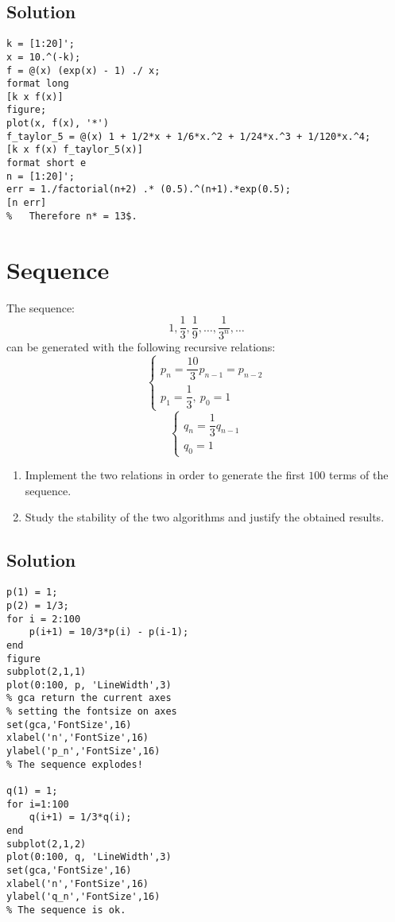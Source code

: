 \documentclass[12pt, a4paper]{report}
\begin{document}
    \subsection*{Solution}
        \begin{lstlisting}[style=Matlab]
%   Evaluate f(x) for values of x around zero (try with xk = 10^{-k}, k in [1,20]). What do you obtain? Explain the results.
k = [1:20]';
x = 10.^(-k);
f = @(x) (exp(x) - 1) ./ x;
format long
[k x f(x)]
figure;
plot(x, f(x), '*')
f_taylor_5 = @(x) 1 + 1/2*x + 1/6*x.^2 + 1/24*x.^3 + 1/120*x.^4;
[k x f(x) f_taylor_5(x)]
format short e
n = [1:20]';
err = 1./factorial(n+2) .* (0.5).^(n+1).*exp(0.5);
[n err]
%   Therefore n* = 13$.            
        \end{lstlisting}

    \newpage

    \section{Sequence}
        The sequence: 
        \[1, \dfrac{1}{3}, \dfrac{1}{9}, \dots, \dfrac{1}{3^n},\dots\]
        can be generated with the following recursive relations: 
        \[
        \begin{cases}
            p_n=\dfrac{10}{3}p_{n-1}=p_{n-2}  \\
            p_1 = \dfrac{1}{3}, \: p_0=1
        \end{cases}
        \]
        \[
        \begin{cases}
            q_n=\dfrac{1}{3}q_{n-1}  \\
            q_0=1
        \end{cases}
        \]
        \begin{enumerate}
            \item Implement the two relations in order to generate the first $100$ terms of the sequence.
            \item Study the stability of the two algorithms and justify the obtained results. 
        \end{enumerate}
    \subsection*{Solution}
        \begin{lstlisting}[style=Matlab]
p(1) = 1;
p(2) = 1/3;
for i = 2:100
    p(i+1) = 10/3*p(i) - p(i-1);
end
figure
subplot(2,1,1)
plot(0:100, p, 'LineWidth',3)
% gca return the current axes 
% setting the fontsize on axes
set(gca,'FontSize',16)
xlabel('n','FontSize',16)
ylabel('p_n','FontSize',16)
% The sequence explodes!

q(1) = 1;
for i=1:100
    q(i+1) = 1/3*q(i);
end
subplot(2,1,2)
plot(0:100, q, 'LineWidth',3)
set(gca,'FontSize',16)
xlabel('n','FontSize',16)
ylabel('q_n','FontSize',16)
% The sequence is ok.
        \end{lstlisting}
\end{document}

